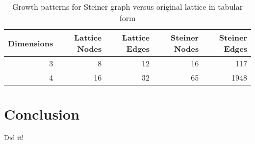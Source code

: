 \documentclass[12pt]{dalcsthesis}
\begin{document}
\begin{table}[tbh]
\centering
\begin{tabular}{|r|r|r|r|r|}
    \hline
    Dimensions & Lattice Nodes & Lattice Edges & Steiner Nodes & Steiner Edges \\
    \hline \hline
    3 & 8 & 12 & 16 & 117 \\
    \hline
    4 & 16 & 32 & 65 & 1948 \\
    \hline
\end{tabular}
 \caption{\label{tab-steiner_growth}Growth patterns for Steiner
    graph versus original lattice in tabular form}
\end{table}


\chapter{Conclusion}

Did it!



\end{document}
